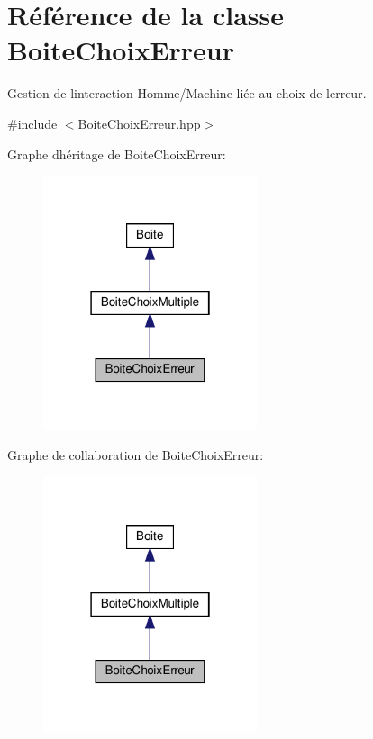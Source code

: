 \hypertarget{classBoiteChoixErreur}{}\section{Référence de la classe Boite\+Choix\+Erreur}
\label{classBoiteChoixErreur}


Gestion de l\textquotesingle{}interaction Homme/\+Machine liée au choix de l\textquotesingle{}erreur.  




{\ttfamily \#include $<$Boite\+Choix\+Erreur.\+hpp$>$}



Graphe d\textquotesingle{}héritage de Boite\+Choix\+Erreur\+:
\nopagebreak
\begin{figure}[H]
\begin{center}
\leavevmode
\includegraphics[width=178pt]{classBoiteChoixErreur__inherit__graph}
\end{center}
\end{figure}


Graphe de collaboration de Boite\+Choix\+Erreur\+:
\nopagebreak
\begin{figure}[H]
\begin{center}
\leavevmode
\includegraphics[width=178pt]{classBoiteChoixErreur__coll__graph}
\end{center}
\end{figure}
